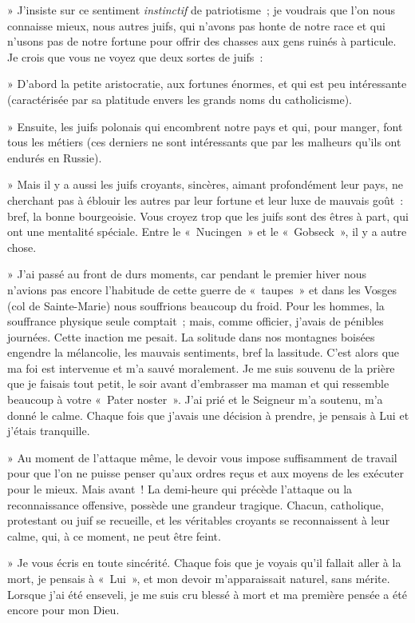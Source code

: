 \documentclass[french,twoside]{book} %
\begin{document}
{ » J’insiste sur ce sentiment {\itshape instinctif} de patriotisme ; je voudrais que l’on nous connaisse mieux, nous autres juifs, qui n’avons pas honte de notre race et qui n’usons pas de notre fortune pour offrir des chasses aux gens ruinés à particule. Je crois que vous ne voyez que deux sortes de juifs :‌\par
 » D’abord la petite aristocratie, aux fortunes énormes, et qui est peu intéressante (caractérisée par sa platitude envers les grands noms du catholicisme).‌\par
 » Ensuite, les juifs polonais qui encombrent notre pays et qui, pour manger, font tous les métiers (ces derniers ne sont intéressants que par les malheurs qu’ils ont endurés en Russie).‌\par
 » Mais il y a aussi les juifs croyants, sincères, aimant profondément leur pays, ne cherchant pas à éblouir les autres par leur fortune et leur luxe de mauvais goût : bref, la bonne bourgeoisie. Vous croyez trop que les juifs sont des êtres à part, qui ont une mentalité spéciale. Entre le « Nucingen » et le « Gobseck », il y a autre chose.‌\par
 » J’ai passé au front de durs moments, car pendant le premier hiver nous n’avions pas encore l’habitude de cette guerre de « taupes » et dans les Vosges (col de Sainte-Marie) nous souffrions beaucoup du froid. Pour les hommes, la souffrance physique seule comptait ; mais, comme officier, j’avais de pénibles journées. Cette inaction me pesait. La solitude dans nos montagnes boisées engendre la mélancolie, les mauvais sentiments, bref la lassitude. C’est alors que ma foi est intervenue et m’a sauvé moralement. Je me suis souvenu de la prière que je faisais tout petit, le soir avant d’embrasser ma maman et qui ressemble beaucoup à votre « Pater noster ». J’ai prié et le Seigneur m’a soutenu, m’a donné le calme. Chaque fois que j’avais une décision à prendre, je pensais à Lui et j’étais tranquille.‌\par
 » Au moment de l’attaque même, le devoir vous impose suffisamment de travail pour que l’on ne puisse penser qu’aux ordres reçus et aux moyens de les exécuter pour le mieux. Mais avant ! La demi-heure qui précède l’attaque ou la reconnaissance offensive, possède une grandeur tragique. Chacun, catholique, protestant ou juif se recueille, et les véritables croyants se reconnaissent à leur calme, qui, à ce moment, ne peut être feint.‌\par
 » Je vous écris en toute sincérité. Chaque fois que je voyais qu’il fallait aller à la mort, je pensais à « Lui », et mon devoir m’apparaissait naturel, sans mérite. Lorsque j’ai été enseveli, je me suis cru blessé à mort et ma première pensée a été encore pour mon Dieu.‌\par
}
\end{document}

